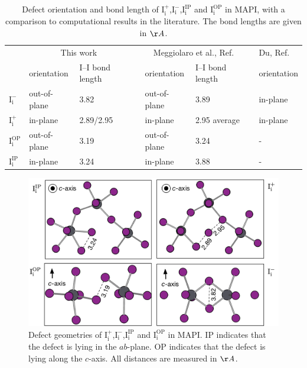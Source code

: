 \begin{table}[h!]\centering
\begin{tabular}{llllllll}\toprule
\phantom{abcd}&\multicolumn{2}{c}{This work} &\phantom{a} &\multicolumn{2}{c}{Meggiolaro et al., Ref. \cite{Meggiolaro2018}}&\phantom{a} & Du, Ref. \cite{Du2015} \\
\cline{2-3} \cline{5-6} \cline{8-8}
& orientation & I--I bond length && orientation & I--I bond length  && orientation \\  
\midrule
$\mathrm{I}_\mathrm{i}^-$ &  out-of-plane & 3.82  &&  out-of-plane & 3.89 && in-plane \\
$\mathrm{I}_\mathrm{i}^+$ & in-plane & 2.89/2.95 && in-plane & 2.95 average && in-plane \\
$\mathrm{I}_\mathrm{i}^\mathrm{OP}$ & out-of-plane & 3.19 && out-of-plane & 3.24 && - \\
$\mathrm{I}_\mathrm{i}^\mathrm{IP}$ & in-plane & 3.24 && in-plane & 3.88 && - \\
\end{tabular} 
\caption[Defect orientation and bond length of $\mathrm{I}_\mathrm{i}^+$, $\mathrm{I}_\mathrm{i}^-$ and $\mathrm{I}_\mathrm{i}^0$]{\label{compare_geoms}Defect orientation and bond length of $\mathrm{I}_\mathrm{i}^+$,$\mathrm{I}_\mathrm{i}^-$,$\mathrm{I}_\mathrm{i}^\mathrm{IP}$ and $\mathrm{I}_\mathrm{i}^\mathrm{OP}$ in MAPI, with a comparison to computational results in the literature. The bond lengths are given in $\AA$.}
\end{table}

\begin{figure}[h!]
\centering
  \includegraphics[width=1.0\columnwidth]{figures/ch6/defect_geometries.png}
  \caption[Defect geometries of $\mathrm{I}_\mathrm{i}^+$,$\mathrm{I}_\mathrm{i}^-$ and $\mathrm{I}_\mathrm{i}^0$]{Defect geometries of $\mathrm{I}_\mathrm{i}^+$,$\mathrm{I}_\mathrm{i}^-$,$\mathrm{I}_\mathrm{i}^\mathrm{IP}$ and $\mathrm{I}_\mathrm{i}^\mathrm{OP}$ in MAPI. IP indicates that the defect is lying in the $ab$-plane. OP indicates that the defect is lying along the $c$-axis. All distances are measured in $\AA$.}
\label{relaxation_workflow}
\end{figure}

